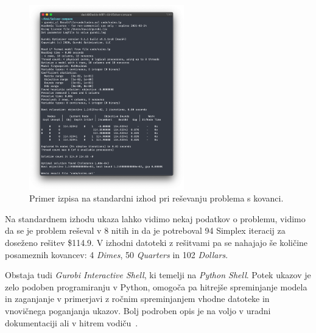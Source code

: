 \documentclass[a4paper,11pt]{article}
\begin{document}
\begin{figure}[htpb] \centering
	\includegraphics[width=0.6\textwidth]{images/gurobi-run_coins.png}
	\caption{Primer izpisa na standardni izhod pri reševanju problema s kovanci.}
	\label{img:coins_stdout}
\end{figure}



Na standardnem izhodu ukaza lahko vidimo nekaj podatkov o problemu, vidimo da se je problem reševal v 8 nitih in da je potreboval 94 Simplex iteracij za doseženo rešitev \$114.9. V izhodni datoteki z rešitvami pa se nahajajo še količine posameznih kovancev: 4 \textit{Dimes}, 50 \textit{Quarters} in 102 \textit{Dollars}.

Obstaja tudi \textit{Gurobi Interactive Shell}, ki temelji na \textit{Python Shell}. Potek ukazov je zelo podoben programiranju v Python, omogoča pa hitrejše spreminjanje modela in zaganjanje v primerjavi z ročnim spreminjanjem vhodne datoteke in vnovičnega poganjanja ukazov. Bolj podroben opis je na voljo v uradni dokumentaciji ali v hitrem vodiču~\cite{GurobiQuickstart:2020}.
\end{document}
